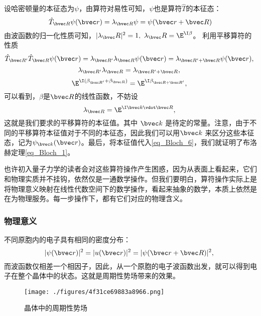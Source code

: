 设哈密顿量的本征态为$\psi$，由算符对易性可知，$\psi$也是算符$\hat{T}$的本征态：
\begin{equation}\label{eq_Bloch_6}
\hat{T}_{\bvec R} \psi (\bvec r) = \lambda_{\bvec R}\psi =\psi(\bvec r + \bvec R) 
\end{equation}
由波函数的归一化性质可知，$|\lambda_\bvec R |^2 = 1,~ \lambda_\bvec R = \E^{\I \beta}$。 利用平移算符的性质
\begin{equation}
\hat{T}_{\bvec R'} \hat{T}_{\bvec R}\psi (\bvec r) = \lambda_{\bvec R'}\lambda_{\bvec R}\psi (\bvec r) = \lambda_{\bvec R' + \bvec R} \psi (\bvec r),~
\end{equation}
\begin{equation}
\lambda_{\bvec R'}\lambda_{\bvec R} =  \lambda_{\bvec R' + \bvec R},~
\end{equation}
\begin{equation}
\E^{\I (\beta_{\bvec R'}+ \beta_{\bvec R})} = \E^{\I \beta_{\bvec R + \bvec R'}},~
\end{equation}
可以看到，$\beta$是$\bvec R$的线性函数，不妨设
\begin{equation}
\lambda_{\bvec R} = \E^{\I \bvec k \vdot  \bvec R},~
\end{equation}
这就是我们要求的平移算符的本征值。其中 $\bvec k$ 是待定的常量。注意，由于不同的平移算符本征值对于不同的本征态，因此我们可以用$\bvec k$ 来区分这些本征态，记为$\psi_{\bvec k} (\bvec r)$。最后，将本征值代入\autoref{eq_Bloch_6}，我们就证明了布洛赫定理\autoref{eq_Bloch_1}。

也许初入量子力学的读者会对这些算符操作产生困惑，因为从表面上看起来，它们和物理实质并不挂钩，依然仅是一通数学操作。但我们要明白，算符操作实际上是将物理意义映射在线性代数空间下的数学操作，看起来抽象的数学，本质上依然是在为物理服务。每一步操作下，都有它们对应的物理含义。

\subsubsection{物理意义}
不同原胞内的电子具有相同的密度分布：
\begin{equation}
|\psi(\bvec r)|^2 = |u(\bvec r)|^2 = |\psi(\bvec r + \bvec R)|^2,~
\end{equation}
而波函数仅相差一个相因子，因此，从一个原胞的电子波函数出发，就可以得到电子在整个晶体中的状态。这就是周期性势场带来的效果。

\begin{figure}[ht]
\centering
\texttt{[image: ./figures/4f31ce69883a8966.png]}
\caption{晶体中的周期性势场} \label{fig_Bloch_2}
\end{figure}

